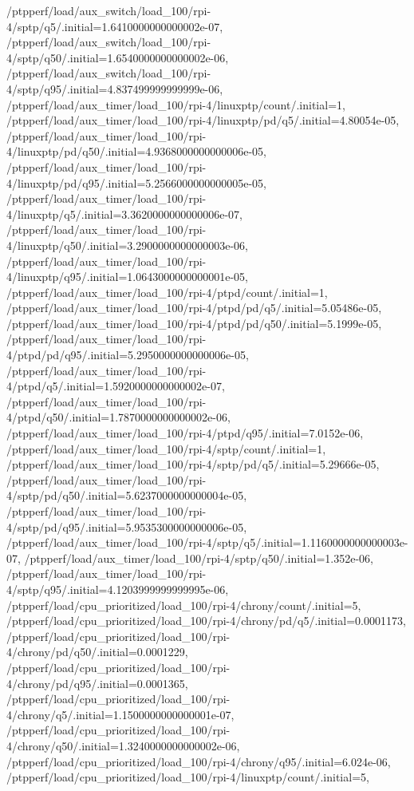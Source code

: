 {    /ptpperf/load/aux_switch/load_100/rpi-4/sptp/q5/.initial=1.6410000000000002e-07,
    /ptpperf/load/aux_switch/load_100/rpi-4/sptp/q50/.initial=1.6540000000000002e-06,
    /ptpperf/load/aux_switch/load_100/rpi-4/sptp/q95/.initial=4.837499999999999e-06,
    /ptpperf/load/aux_timer/load_100/rpi-4/linuxptp/count/.initial=1,
    /ptpperf/load/aux_timer/load_100/rpi-4/linuxptp/pd/q5/.initial=4.80054e-05,
    /ptpperf/load/aux_timer/load_100/rpi-4/linuxptp/pd/q50/.initial=4.9368000000000006e-05,
    /ptpperf/load/aux_timer/load_100/rpi-4/linuxptp/pd/q95/.initial=5.2566000000000005e-05,
    /ptpperf/load/aux_timer/load_100/rpi-4/linuxptp/q5/.initial=3.3620000000000006e-07,
    /ptpperf/load/aux_timer/load_100/rpi-4/linuxptp/q50/.initial=3.2900000000000003e-06,
    /ptpperf/load/aux_timer/load_100/rpi-4/linuxptp/q95/.initial=1.0643000000000001e-05,
    /ptpperf/load/aux_timer/load_100/rpi-4/ptpd/count/.initial=1,
    /ptpperf/load/aux_timer/load_100/rpi-4/ptpd/pd/q5/.initial=5.05486e-05,
    /ptpperf/load/aux_timer/load_100/rpi-4/ptpd/pd/q50/.initial=5.1999e-05,
    /ptpperf/load/aux_timer/load_100/rpi-4/ptpd/pd/q95/.initial=5.2950000000000006e-05,
    /ptpperf/load/aux_timer/load_100/rpi-4/ptpd/q5/.initial=1.5920000000000002e-07,
    /ptpperf/load/aux_timer/load_100/rpi-4/ptpd/q50/.initial=1.7870000000000002e-06,
    /ptpperf/load/aux_timer/load_100/rpi-4/ptpd/q95/.initial=7.0152e-06,
    /ptpperf/load/aux_timer/load_100/rpi-4/sptp/count/.initial=1,
    /ptpperf/load/aux_timer/load_100/rpi-4/sptp/pd/q5/.initial=5.29666e-05,
    /ptpperf/load/aux_timer/load_100/rpi-4/sptp/pd/q50/.initial=5.6237000000000004e-05,
    /ptpperf/load/aux_timer/load_100/rpi-4/sptp/pd/q95/.initial=5.9535300000000006e-05,
    /ptpperf/load/aux_timer/load_100/rpi-4/sptp/q5/.initial=1.1160000000000003e-07,
    /ptpperf/load/aux_timer/load_100/rpi-4/sptp/q50/.initial=1.352e-06,
    /ptpperf/load/aux_timer/load_100/rpi-4/sptp/q95/.initial=4.1203999999999995e-06,
    /ptpperf/load/cpu_prioritized/load_100/rpi-4/chrony/count/.initial=5,
    /ptpperf/load/cpu_prioritized/load_100/rpi-4/chrony/pd/q5/.initial=0.0001173,
    /ptpperf/load/cpu_prioritized/load_100/rpi-4/chrony/pd/q50/.initial=0.0001229,
    /ptpperf/load/cpu_prioritized/load_100/rpi-4/chrony/pd/q95/.initial=0.0001365,
    /ptpperf/load/cpu_prioritized/load_100/rpi-4/chrony/q5/.initial=1.1500000000000001e-07,
    /ptpperf/load/cpu_prioritized/load_100/rpi-4/chrony/q50/.initial=1.3240000000000002e-06,
    /ptpperf/load/cpu_prioritized/load_100/rpi-4/chrony/q95/.initial=6.024e-06,
    /ptpperf/load/cpu_prioritized/load_100/rpi-4/linuxptp/count/.initial=5,
}

